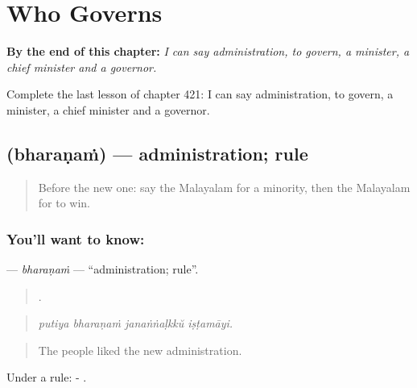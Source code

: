 
\chapter{Who Governs}
\label{ch:ml-who-governs}

\begin{chapteropening}
\textbf{By the end of this chapter:} \emph{I can say administration, to govern, a minister, a chief minister and a governor.}

Complete the last lesson of chapter 421: I can say administration, to govern, a minister, a chief minister and a governor.
\end{chapteropening}

\section[\texorpdfstring{\ml{ഭരണം} (bharaṇaṁ)}{ഭരണം (bharaṇaṁ)}]{ (bharaṇaṁ) — administration; rule}

\label{lesson:ML-C421-bharanam}



\begin{quote}
Before the new one: say the Malayalam for a minority, then the Malayalam for to win.
\end{quote}

\subsection*{You'll want to know: }
\textbf{} — \emph{bharaṇaṁ} — \textquotedblleft{}administration; rule\textquotedblright{}.

\begin{quote}
   .
\end{quote}

\begin{quote}
\emph{putiya bharaṇaṁ janaṅṅaḷkkŭ iṣṭamāyi.}
\end{quote}

\begin{quote}
The people liked the new administration.
\end{quote}

Under a rule: - .

